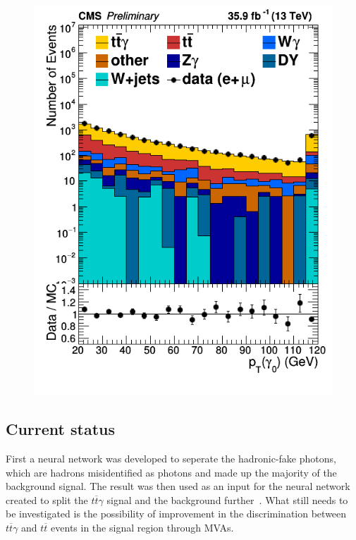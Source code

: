 \documentclass[11pt]{scrartcl}
\begin{document}
\begin{figure}[H]
\begin{minipage}{.5\textwidth}
  \includegraphics[width=1\linewidth]{figures/PhotonGood0_pt_log.png}
  \label{fig:PhotonPTlog}
\end{minipage}
\end{figure}

	\subsection{Current status}
	
	First a neural network was developed to seperate the hadronic-fake photons, which are hadrons misidentified as photons and made up the majority of the background signal. The result was then used as an input for the neural network created to split the $t\overline{t}\gamma$ signal and the background further~\cite{ATLAS}. What still needs to be investigated is the possibility of improvement in the discrimination between $t\overline{t}\gamma$ and $t\overline{t}$ events in the signal region through MVAs.
\end{document}
